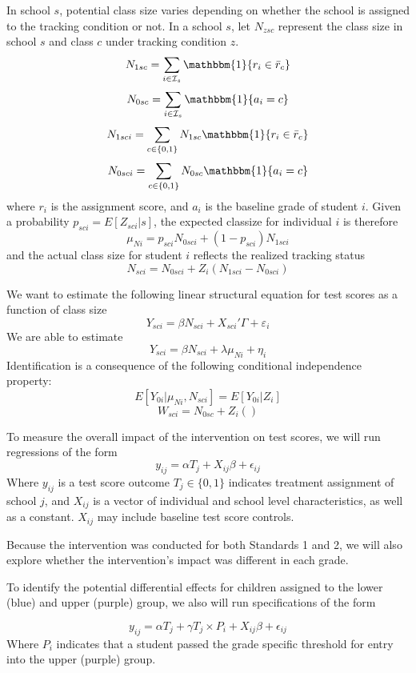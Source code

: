 In school $s$, potential class size varies depending on whether the school is assigned to the tracking condition or not. In a school $s$, let $N_{zsc}$ represent the class size in school $s$ and class $c$ under tracking condition $z$.  
\[N_{1sc} = \sum_{i \in \mathcal{I}_s} \mathbbm{1}\{ r_i \in \bar{r}_c \} \]
\[N_{0sc} = \sum_{i \in \mathcal{I}_s} \mathbbm{1}\{ a_i=c \} \]
\[N_{1sci} = \sum_{c \in \{0,1\}} N_{1sc} \mathbbm{1}\{r_i \in \bar{r}_c\} \]
\[N_{0sci} = \sum_{c \in \{0,1\}} N_{0sc} \mathbbm{1}\{a_i = c\} \]
where $r_i$ is the assignment score, and $a_i$ is the baseline grade of student $i$. Given a probability $p_{sci} = E[Z_{sci}|s]$, the expected classize for individual $i$ is therefore
\[ \mu_{Ni} = p_{sci} N_{0sci} + (1-p_{sci}) N_{1sci} \]
and the actual class size for student $i$ reflects the realized tracking status
\[ N_{sci} = N_{0sci} + Z_i ( N_{1sci} - N_{0sci} )\]

We want to estimate the following linear structural equation for test scores as a function of class size
\[ Y_{sci} = \beta N_{sci} + X_{sci}' \Gamma + \varepsilon_i \]
We are able to estimate 
\[ Y_{sci} = \beta N_{sci} + \lambda \mu_{Ni} + \eta_i \]
Identification is a consequence of the following conditional independence property:
\[E[Y_{0i}|\mu_{Ni},N_{sci}] = E\left[Y_{0i} | Z_i\right] \]
\[ W_{sci} = N_{0sc} + Z_i ( )\]

To measure the overall impact of the intervention on test scores, we will run regressions of the form
\[ y_{ij} = \alpha T_j + X_{ij} \beta + \epsilon_{ij} \]
Where $y_{ij}$ is a test score outcome $T_j \in \{0,1\}$ indicates  treatment assignment of school $j$, and $X_{ij}$ is a vector of individual and school level characteristics, as well as a constant. $X_{ij}$ may include baseline test score controls.

Because the intervention was conducted for both Standards 1 and 2, we will also explore whether the intervention's impact was different in each grade.

To identify the potential differential effects for children assigned to the lower (blue) and upper (purple) group, we also will run specifications of the form

\[ y_{ij} = \alpha T_j + \gamma T_j \times P_{i} + X_{ij} \beta + \epsilon_{ij} \]
Where $P_i$ indicates that a student passed the grade specific threshold for entry into the upper (purple) group. 